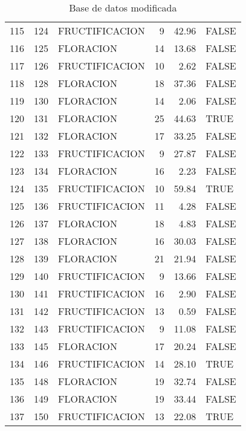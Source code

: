 \begin{table}[ht]
\begin{tabular}{rllrrl}
  115 & 124 & FRUCTIFICACION &   9 & 42.96 & FALSE \\ 
  116 & 125 & FLORACION &  14 & 13.68 & FALSE \\ 
  117 & 126 & FRUCTIFICACION &  10 & 2.62 & FALSE \\ 
  118 & 128 & FLORACION &  18 & 37.36 & FALSE \\ 
  119 & 130 & FLORACION &  14 & 2.06 & FALSE \\ 
  120 & 131 & FLORACION &  25 & 44.63 & TRUE \\ 
  121 & 132 & FLORACION &  17 & 33.25 & FALSE \\ 
  122 & 133 & FRUCTIFICACION &   9 & 27.87 & FALSE \\ 
  123 & 134 & FLORACION &  16 & 2.23 & FALSE \\ 
  124 & 135 & FRUCTIFICACION &  10 & 59.84 & TRUE \\ 
  125 & 136 & FRUCTIFICACION &  11 & 4.28 & FALSE \\ 
  126 & 137 & FLORACION &  18 & 4.83 & FALSE \\ 
  127 & 138 & FLORACION &  16 & 30.03 & FALSE \\ 
  128 & 139 & FLORACION &  21 & 21.94 & FALSE \\ 
  129 & 140 & FRUCTIFICACION &   9 & 13.66 & FALSE \\ 
  130 & 141 & FRUCTIFICACION &  16 & 2.90 & FALSE \\ 
  131 & 142 & FRUCTIFICACION &  13 & 0.59 & FALSE \\ 
  132 & 143 & FRUCTIFICACION &   9 & 11.08 & FALSE \\ 
  133 & 145 & FLORACION &  17 & 20.24 & FALSE \\ 
  134 & 146 & FRUCTIFICACION &  14 & 28.10 & TRUE \\ 
  135 & 148 & FLORACION &  19 & 32.74 & FALSE \\ 
  136 & 149 & FLORACION &  19 & 33.44 & FALSE \\ 
  137 & 150 & FRUCTIFICACION &  13 & 22.08 & TRUE \\ 
   \hline
\end{tabular}
\caption{Base de datos modificada} 
\label{table:dftable}
\end{table}
